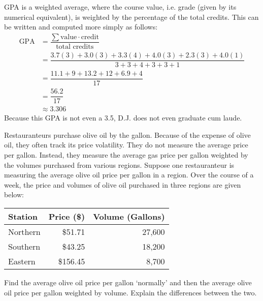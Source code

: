 \documentclass[11pt,letterpaper]{article}
\begin{document}
\sol GPA is a weighted average, where the course value, i.e. grade (given by its numerical equivalent), is weighted by the percentage of the total credits. This can be written and computed more simply as follows:
	\[
	\begin{aligned}
	\text{GPA}&= \dfrac{\sum \text{value} \cdot \text{credit}}{\text{total credits}} \\[0.3cm]
	&= \dfrac{3.7(3) + 3.0(3) + 3.3(4) + 4.0(3) + 2.3(3) + 4.0(1)}{3 + 3 + 4 + 3 + 3 + 1} \\[0.3cm]
	&= \dfrac{11.1 + 9 + 13.2 + 12 + 6.9 + 4}{17} \\[0.3cm]
	&= \dfrac{56.2}{17} \\[0.3cm]
	&\approx 3.306
	\end{aligned}
	\] \pspace
Because this GPA is not even a 3.5, D.J. does not even graduate cum laude. 



\newpage



Restauranteurs purchase olive oil by the gallon. Because of the expense of olive oil, they often track its price volatility. They do not measure the average price per gallon. Instead, they measure the average gas price per gallon weighted by the volumes purchased from various regions. Suppose one restauranteur is measuring the average olive oil price per gallon in a region. Over the course of a week, the price and volumes of olive oil purchased in three regions are given below: \par
	\begin{table}[!ht]
	\centering
        \begin{tabular}{lrr} \hline
	Station & Price (\$) & Volume (Gallons) \\ \hline
	Northern & \$51.71 & 27,600 \\
	Southern & \$43.25 & 18,200 \\
	Eastern & \$156.45 & 8,700
        \end{tabular}
	\end{table} \par
Find the average olive oil price per gallon `normally' and then the average olive oil price per gallon weighted by volume. Explain the differences between the two. \pspace
\end{document}
